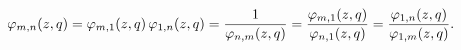 \[\mathop{\varphi_{m,n}\/}\nolimits\!\left(z,q\right)=\mathop{\varphi_{m,1}\/}%
\nolimits\!\left(z,q\right)\mathop{\varphi_{1,n}\/}\nolimits\!\left(z,q\right)%
=\frac{1}{\mathop{\varphi_{n,m}\/}\nolimits\!\left(z,q\right)}=\frac{\mathop{%
\varphi_{m,1}\/}\nolimits\!\left(z,q\right)}{\mathop{\varphi_{n,1}\/}\nolimits%
\!\left(z,q\right)}=\frac{\mathop{\varphi_{1,n}\/}\nolimits\!\left(z,q\right)}%
{\mathop{\varphi_{1,m}\/}\nolimits\!\left(z,q\right)}.\]